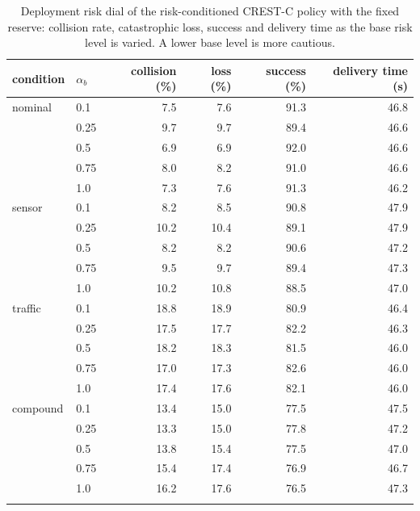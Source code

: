 \begin{table}[tb]
\centering
\caption{Deployment risk dial of the risk-conditioned CREST-C policy with the fixed reserve: collision rate, catastrophic loss, success and delivery time as the base risk level is varied. A lower base level is more cautious.}
\label{tab:dial}
\small
\begin{tabular}{llrrrr}
\toprule
condition & $\alpha_b$ & collision (\%) & loss (\%) & success (\%) & delivery time (s) \\
\midrule
nominal & 0.1 & 7.5 & 7.6 & 91.3 & 46.8 \\
 & 0.25 & 9.7 & 9.7 & 89.4 & 46.6 \\
 & 0.5 & 6.9 & 6.9 & 92.0 & 46.6 \\
 & 0.75 & 8.0 & 8.2 & 91.0 & 46.6 \\
 & 1.0 & 7.3 & 7.6 & 91.3 & 46.2 \\
\addlinespace[2pt]
sensor & 0.1 & 8.2 & 8.5 & 90.8 & 47.9 \\
 & 0.25 & 10.2 & 10.4 & 89.1 & 47.9 \\
 & 0.5 & 8.2 & 8.2 & 90.6 & 47.2 \\
 & 0.75 & 9.5 & 9.7 & 89.4 & 47.3 \\
 & 1.0 & 10.2 & 10.8 & 88.5 & 47.0 \\
\addlinespace[2pt]
traffic & 0.1 & 18.8 & 18.9 & 80.9 & 46.4 \\
 & 0.25 & 17.5 & 17.7 & 82.2 & 46.3 \\
 & 0.5 & 18.2 & 18.3 & 81.5 & 46.0 \\
 & 0.75 & 17.0 & 17.3 & 82.6 & 46.0 \\
 & 1.0 & 17.4 & 17.6 & 82.1 & 46.0 \\
\addlinespace[2pt]
compound & 0.1 & 13.4 & 15.0 & 77.5 & 47.5 \\
 & 0.25 & 13.3 & 15.0 & 77.8 & 47.2 \\
 & 0.5 & 13.8 & 15.4 & 77.5 & 47.0 \\
 & 0.75 & 15.4 & 17.4 & 76.9 & 46.7 \\
 & 1.0 & 16.2 & 17.6 & 76.5 & 47.3 \\
\addlinespace[2pt]
\bottomrule
\end{tabular}
\end{table}